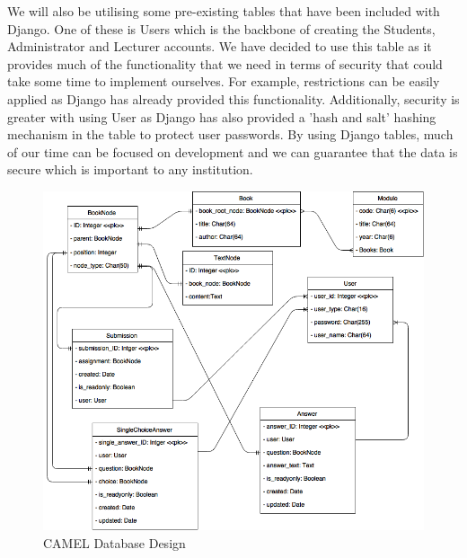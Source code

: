 	We will also be utilising some pre-existing tables that have been included with Django. One of these is Users which is the backbone of creating the Students, Administrator and Lecturer accounts. We have decided to use this table as it provides much of the functionality that we need in terms of security that could take some time to implement ourselves. For example, restrictions can be easily applied as Django has already provided this functionality. Additionally, security is greater with using User as Django has also provided a 'hash and salt' hashing mechanism in the table to protect user passwords. By using Django tables, much of our time can be focused on development and we can guarantee that the data is secure which is important to any institution.\\	
	
	\begin{figure}[h]
		\includegraphics[scale=0.5]{implementation/img/database_design}
		\caption{CAMEL Database Design}
		\centering
	\end{figure}